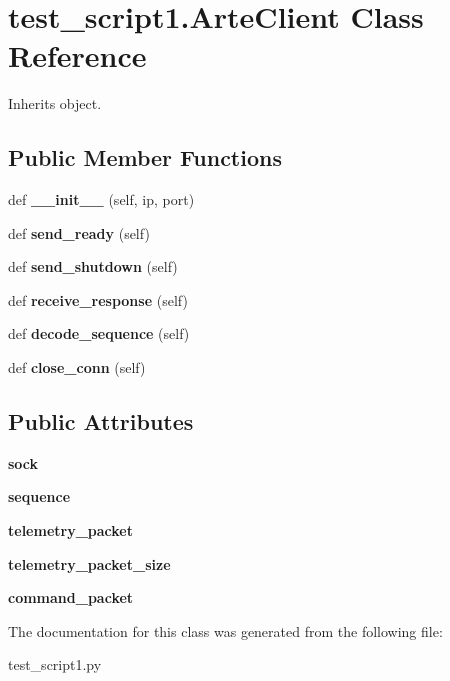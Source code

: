 \section{test\+\_\+script1.\+Arte\+Client Class Reference}
\label{classtest__script1_1_1_arte_client}


Inherits object.

\subsection*{Public Member Functions}
\begin{DoxyCompactItemize}
\item 
def {\bfseries \+\_\+\+\_\+init\+\_\+\+\_\+} (self, ip, port)\label{classtest__script1_1_1_arte_client_a6e05a3112a879b9a483598768dd6516f}

\item 
def {\bfseries send\+\_\+ready} (self)\label{classtest__script1_1_1_arte_client_a70f22d3ebfaefb7b34f2b14e7654ab27}

\item 
def {\bfseries send\+\_\+shutdown} (self)\label{classtest__script1_1_1_arte_client_abd36bbe05ad4f1205434aa33c72759a3}

\item 
def {\bfseries receive\+\_\+response} (self)\label{classtest__script1_1_1_arte_client_a3844e09eed8199db63c8a890375dafc6}

\item 
def {\bfseries decode\+\_\+sequence} (self)\label{classtest__script1_1_1_arte_client_ac180854792419d5f833bb9d204a61356}

\item 
def {\bfseries close\+\_\+conn} (self)\label{classtest__script1_1_1_arte_client_a59ef8b1548ccac6895bed4937bffbf1b}

\end{DoxyCompactItemize}
\subsection*{Public Attributes}
\begin{DoxyCompactItemize}
\item 
{\bfseries sock}\label{classtest__script1_1_1_arte_client_a7a696c46e3a31b495e6e5a956d145372}

\item 
{\bfseries sequence}\label{classtest__script1_1_1_arte_client_a4b0259b189312d45c76e26c856919fea}

\item 
{\bfseries telemetry\+\_\+packet}\label{classtest__script1_1_1_arte_client_a2c775f91c240200625b36b57ead85464}

\item 
{\bfseries telemetry\+\_\+packet\+\_\+size}\label{classtest__script1_1_1_arte_client_ad77794c171f0532b20d3c3b734233e72}

\item 
{\bfseries command\+\_\+packet}\label{classtest__script1_1_1_arte_client_a96cc7ecb9709017c4ea435d2d34ebf0c}

\end{DoxyCompactItemize}


The documentation for this class was generated from the following file\+:\begin{DoxyCompactItemize}
\item 
test\+\_\+script1.\+py\end{DoxyCompactItemize}

